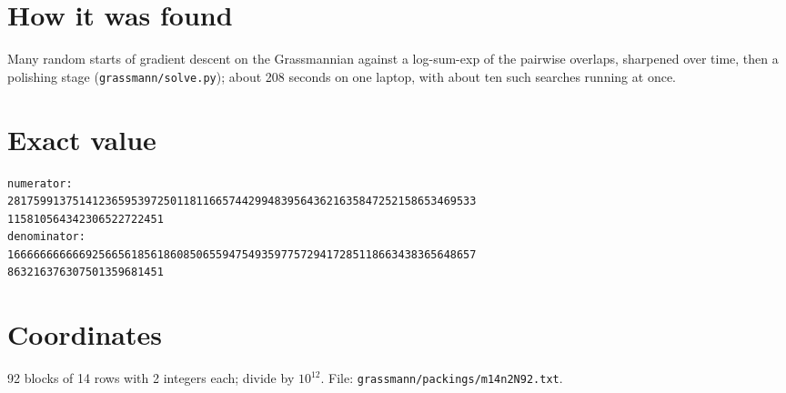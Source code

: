 \documentclass[11pt,a4paper]{article}
\begin{document}
\section{How it was found}
Many random starts of gradient descent on the Grassmannian against a log-sum-exp of the pairwise overlaps, sharpened over time, then a polishing stage (\texttt{grassmann/solve.py}); about 208 seconds on one laptop, with about ten such searches running at once.


\appendix
\section{Exact value}
{\small
\begin{verbatim}
numerator:
281759913751412365953972501181166574429948395643621635847252158653469533
115810564342306522722451
denominator:
166666666666925665618561860850655947549359775729417285118663438365648657
863216376307501359681451
\end{verbatim}}

\section{Coordinates}
92 blocks of 14 rows with 2 integers each; divide by $10^{12}$. File: \texttt{grassmann/packings/m14n2N92.txt}.
{\tiny
\begin{multicols}{4}
\end{multicols}}
\end{document}
